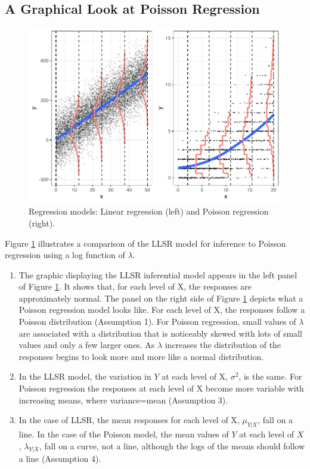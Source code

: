 \documentclass[
]{krantz}
\providecommand{\tightlist}{%
  \setlength{\itemsep}{0pt}\setlength{\parskip}{0pt}}
\begin{document}
\subsection{A Graphical Look at Poisson Regression}\label{a-graphical-look-at-poisson-regression}

\begin{figure}

{\centering \includegraphics[width=0.6\linewidth]{bookdown-BeyondMLR_files/figure-latex/OLSpois-1} 

}

\caption{Regression models: Linear regression (left) and Poisson regression (right).}\label{fig:OLSpois}
\end{figure}

Figure \ref{fig:OLSpois} illustrates a comparison of the LLSR model for inference to Poisson regression using a log function of \(\lambda\).

\begin{enumerate}
\def\labelenumi{\arabic{enumi}.}
\tightlist
\item
  The graphic displaying the LLSR inferential model appears in the left panel of Figure \ref{fig:OLSpois}. It shows that, for each level of X, the responses are approximately normal. The panel on the right side of Figure \ref{fig:OLSpois} depicts what a Poisson regression model looks like. For each level of X, the responses follow a Poisson distribution (Assumption 1). For Poisson regression, small values of \(\lambda\) are associated with a distribution that is noticeably skewed with lots of small values and only a few larger ones. As \(\lambda\) increases the distribution of the responses begins to look more and more like a normal distribution.
\item
  In the LLSR model, the variation in \(Y\) at each level of X, \(\sigma^2\), is the same. For Poisson regression the responses at each level of X become more variable with increasing means, where variance=mean (Assumption 3).
\item
  In the case of LLSR, the mean responses for each level of X, \(\mu_{Y|X}\), fall on a line. In the case of the Poisson model, the mean values of \(Y\) at each level of \(X\), \(\lambda_{Y|X}\), fall on a curve, not a line, although the logs of the means should follow a line (Assumption 4).
\end{enumerate}
\end{document}
